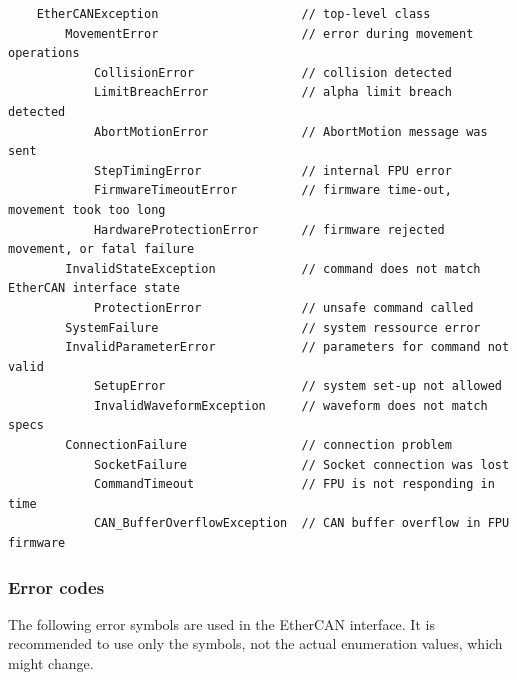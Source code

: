 \documentclass[11pt,a4paper]{scrartcl}
\begin{document}
\begin{verbatim}
    EtherCANException                    // top-level class
        MovementError                    // error during movement operations
            CollisionError               // collision detected
            LimitBreachError             // alpha limit breach detected
            AbortMotionError             // AbortMotion message was sent
            StepTimingError              // internal FPU error
            FirmwareTimeoutError         // firmware time-out, movement took too long
            HardwareProtectionError      // firmware rejected movement, or fatal failure
        InvalidStateException            // command does not match EtherCAN interface state
            ProtectionError              // unsafe command called
        SystemFailure                    // system ressource error
        InvalidParameterError            // parameters for command not valid
            SetupError                   // system set-up not allowed
            InvalidWaveformException     // waveform does not match specs
        ConnectionFailure                // connection problem
            SocketFailure                // Socket connection was lost
            CommandTimeout               // FPU is not responding in time
            CAN_BufferOverflowException  // CAN buffer overflow in FPU firmware

\end{verbatim}

\subsubsection{Error codes}
\label{sec:errorcodes}

The following error symbols are used in the EtherCAN interface.  It is recommended
to use only the symbols, not the actual enumeration values, which
might change.
\end{document}
